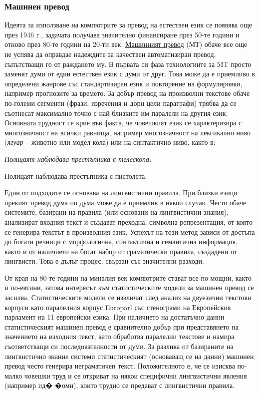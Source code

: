 \begin{multicols}{2}
\subsubsection{Машинен превод}


Идеята за използване на компютрите за превод
 на естествен език се появява още през 1946 г.,
 задачата получава значително финансиране през 50-те години и отново през 80-те години на 20-ти век. \uline{Машинният превод} (МТ) обаче все още не успява да оправдае надеждите за качествен автоматизиран превод, съпътстващи го от раждането му.
В първата си фаза технологиите за MT просто заменят думи от един естествен език с думи от друг. Това може да
 е приемливо в определени жанрове със стандартизиран език и повторение на формулировки, например прогнозите за времето.
 За добър превод на произволни текстове обаче
 по-големи  сегменти (фрази, изречения и дори цели параграфи) трябва да се съотнесат максимално точно с най-близките им паралели на другия
 език. Основната трудност се крие във факта, че
 човешкият език се характеризира с многозначност на 
всички равнища,
 например
 многозначност на лексикално ниво ({\it ягуар} – животно
 или модел кола) или на
 синтактично ниво, както в:

{\it 
\hspace{0.5cm}Полицаят наблюдава престъпника с телескопа.

\hspace{0.5cm}Полицаят наблюдава престъпника с пистолета.
}

Един от подходите се основава на лингвистични правила.
 При близки езици прекият превод дума по дума може да е приемлив в някои случаи. Често обаче системите,
 базирани на правила (или основани на лингвистични знания),
 анализират входния текст и създават преходна, символна
 репрезентация, от която се генерира текстът в
 производния език. Успехът на този метод зависи от
 достъпа до богати речници с морфологична, синтактична
 и семантична информация, както и от наличието на
 богат набор от граматически правила, създадени от лингвисти.
 Това е дълъг процес, свързан със значителни разходи.

От края на 80-те години на миналия век компютрите стават все по-мощни, както и по-евтини, затова интересът към статистическите модели за машинен превод се засилва. Статистическите модели се извличат
 след анализ на двуезични текстови корпуси като
 паралелния корпус Europarl със стенограми на
 Европейския парламент на 11 европейски езика. При наличието на достатъчно данни статистическият машинен превод е сравнително добър при представянето на значението на изходния текст, като обработва паралелни текстове и намира съответстващи си последователности от думи. За разлика от базираните на лингвистично знание системи статистическият (основаващ се на данни) машинен превод често генерира неграматичен текст. Положителното е, че се изисква по-малко човешки труд и се откриват на някои специфични лингвистични явления (например ид�
 �оми), които трудно се предават с лингвистични правила. 


\end{multicols}

